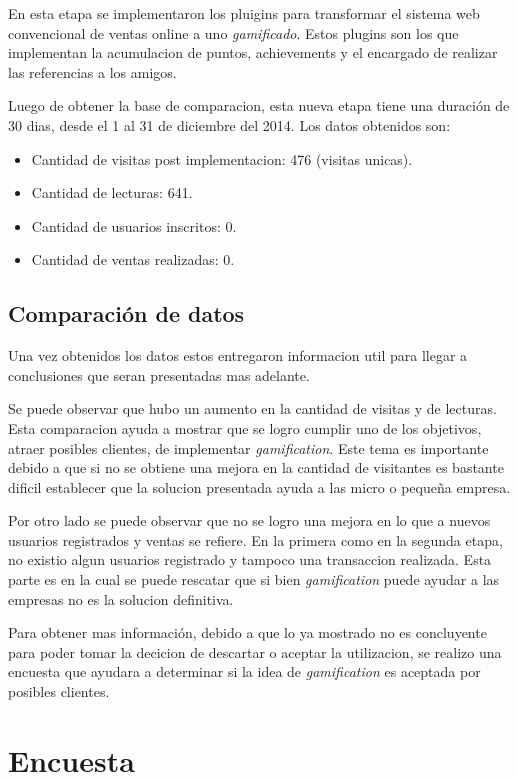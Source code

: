 En esta etapa se implementaron los pluigins para transformar el sistema web convencional de ventas
online a uno \emph{gamificado}. Estos plugins son los que implementan la acumulacion de puntos, 
achievements y el encargado de realizar las referencias a los amigos.

Luego de obtener la base de comparacion, esta nueva etapa tiene una duración de 30 dias, desde 
el 1 al 31 de diciembre del 2014. Los datos obtenidos son:

\begin{itemize}
\item Cantidad de visitas post implementacion: 476 (visitas unicas).
\item Cantidad de lecturas: 641.
\item Cantidad de usuarios inscritos: 0.
\item Cantidad de ventas realizadas: 0.
\end{itemize}

\subsection{Comparación de datos}

Una vez obtenidos los datos estos entregaron informacion util para llegar a conclusiones que seran 
presentadas mas adelante. 

Se puede observar que hubo un aumento en la cantidad de visitas y de lecturas. Esta comparacion 
ayuda a mostrar que se logro cumplir uno de los objetivos, atraer posibles clientes, de implementar
 \emph{gamification}. Este tema es importante debido a que si no se obtiene una mejora en la cantidad
de visitantes es bastante dificil establecer que la solucion presentada ayuda a las micro o pequeña
empresa.

Por otro lado se puede observar que no se logro una mejora en lo que a nuevos usuarios registrados y 
ventas se refiere. En la primera como en la segunda etapa, no existio algun usuarios registrado y tampoco
una transaccion realizada. Esta parte es en la cual se puede rescatar que si bien \emph{gamification} 
puede ayudar a las empresas  no es la solucion definitiva.

Para obtener mas información, debido a que lo ya mostrado no es concluyente para poder tomar la decicion
de descartar o aceptar la utilizacion, se realizo una encuesta que ayudara a determinar si la idea
de \emph{gamification} es aceptada por posibles clientes.


\section{Encuesta}

